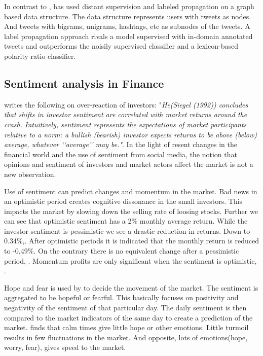 In contrast to \cite[]{becker13}, \cite[]{sperious11} has used distant
supervision and labeled propagation on a graph based data structure. The data
structure represents users with tweets as nodes. And tweets with bigrams,
unigrams, hashtags, etc as subnodes of the tweets. A label propagation approach
rivals a model supervised with in-domain annotated tweets and outperforms the
noisily supervised classifier and a lexicon-based polarity ratio classifier.
\cite[]{sperious11} 

\subsection{Sentiment analysis in Finance}
\cite[p2]{Brown20041} writes the following on over-reaction of investors: 
"\textit{He(Siegel (1992)) concludes that shifts in investor sentiment are correlated
with market returns around the crash. Intuitively, sentiment represents the
expectations of market participants relative to a norm: a bullish (bearish)
investor expects returns to be above (below) average, whatever ‘‘average’’ may
be."}. 
In the light of resent changes in the financial world and the use
of sentiment from social media, the notion that opinions and sentiment of
investors and market actors affect the market is not a new observation.

Use of sentiment can predict changes and momentum in the market.
Bad news in an optimistic period creates cognitive dissonance in the small
investors. This impacts the market by slowing down the selling rate of loosing
stocks. \cite[p29]{doukas10:sentiment_and_momentum}
Further we can see that optimistic sentiment has a 2\% monthly average return.
While the investor sentiment is pessimistic we see a drastic reduction in
returns. Down to 0.34\%,\cite[p5]{doukas10:sentiment_and_momentum}.
After optimistic periods it is indicated that the monthly return is reduced to
-0.49\%. On the contrary there is no equivalent change after a pessimistic
period, \cite[p6-7]{doukas10:sentiment_and_momentum}.
Momentum profits are only significant when the sentiment is optimistic,
\cite[p29]{doukas10:sentiment_and_momentum}.

Hope and fear is used by \cite[]{Zhang201155} to decide the movement of the
market. The sentiment is aggregated to be hopeful or fearful. This basically
focuses on positivity and negativity of the sentiment of that particular day.
The daily sentiment is then compared to the market indicators of the same day
to create a prediction of the market. \cite[]{Zhang201155} finds that calm
times give little hope or other emotions. Little turmoil results in few
fluctuations in the market. And opposite, lots of emotions(hope, worry, fear),
gives speed to the market.


